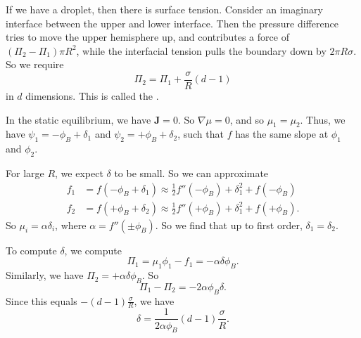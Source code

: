 \documentclass[a4paper]{article}
\begin{document}
If we have a droplet, then there is surface tension. Consider an imaginary interface between the upper and lower interface. Then the pressure difference tries to move the upper hemisphere up, and contributes a force of $(\Pi_2 - \Pi_1) \pi R^2$, while the interfacial tension pulls the boundary down by $2\pi R \sigma$. So we require
\[
  \Pi_2 = \Pi_1 + \frac{\sigma}{R}(d - 1)
\]
in $d$ dimensions. This is called the .

In the static equilibrium, we have $\mathbf{J} = 0$. So $\nabla \mu = 0$, and so $\mu_1 = \mu_2$. Thus, we have $\psi_1 = -\phi_B + \delta_1 $ and $\psi_2 = +\phi_B + \delta_2$, such that $f$ has the same slope at $\phi_1$ and $\phi_2$.
\begin{center}
\end{center}

For large $R$, we expect $\delta$ to be small. So we can approximate
\begin{align*}
  f_1 &= f(-\phi_B + \delta_1) \approx \frac{1}{2} f''(-\phi_B) + \delta_1^2 + f(-\phi_B)\\
  f_2 &= f(+\phi_B + \delta_2) \approx \frac{1}{2} f''(+\phi_B) + \delta_1^2 + f(+\phi_B).
\end{align*}
So $\mu_i = \alpha \delta_i$, where $\alpha = f''(\pm\phi_B)$. So we find that up to first order, $\delta_1 = \delta_2$.

To compute $\delta$, we compute
\[
  \Pi_1 = \mu_1\phi_1 - f_1 = -\alpha \delta \phi_B.
\]
Similarly, we have $\Pi_2 = +\alpha \delta \phi_B$. So
\[
  \Pi_1 - \Pi_2 = -2\alpha \phi_B \delta.
\]
Since this equals $-(d - 1)\frac{\sigma}{R}$, we have
\[
  \delta = \frac{1}{2\alpha \phi_B}(d - 1) \frac{\sigma}{R}.
\]
\end{document}

